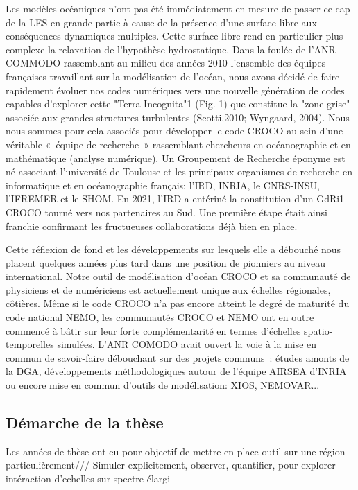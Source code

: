 Les modèles océaniques n’ont pas été immédiatement en mesure de passer ce cap de la LES en grande partie à cause de la présence d’une surface libre aux conséquences dynamiques multiples. Cette surface libre rend en particulier plus complexe la relaxation de l’hypothèse hydrostatique. Dans la foulée de l’ANR COMMODO rassemblant au milieu des années 2010 l’ensemble des équipes françaises travaillant sur la modélisation de l’océan, nous avons décidé de faire rapidement évoluer nos codes numériques vers une nouvelle génération de codes capables d'explorer cette "Terra Incognita"1 (Fig. 1) que constitue la "zone grise" associée aux grandes structures turbulentes (Scotti,2010; Wyngaard, 2004). Nous nous sommes pour cela associés pour développer le code CROCO au sein d’une véritable « équipe de recherche » rassemblant chercheurs en océanographie et en mathématique (analyse numérique). Un Groupement de Recherche éponyme est né associant l’université de Toulouse et les principaux organismes de recherche en informatique et en océanographie français: l’IRD, INRIA, le CNRS-INSU, l’IFREMER et le SHOM. En 2021, l’IRD a entériné la constitution d’un GdRi1 CROCO tourné vers nos partenaires au Sud. Une première étape était ainsi franchie confirmant les fructueuses collaborations déjà bien en place.

Cette réflexion de fond et les développements sur lesquels elle a débouché nous placent quelques années plus tard dans une position de pionniers au niveau international. Notre outil de modélisation d’océan CROCO et sa communauté de physiciens et de numériciens est actuellement unique aux échelles régionales, côtières. Même si le code CROCO n’a pas encore atteint le degré de maturité du code national NEMO, les communautés CROCO et NEMO ont en outre commencé à bâtir sur leur forte complémentarité en termes d’échelles spatio-temporelles simulées. L’ANR COMODO avait ouvert la voie à la mise en commun de savoir-faire débouchant sur des projets communs : études amonts de la DGA, développements méthodologiques autour de l’équipe AIRSEA d’INRIA ou encore mise en commun d’outils de modélisation: XIOS, NEMOVAR...

\subsection{Démarche de la thèse}
Les années de thèse ont eu pour objectif de mettre en place outil sur une région particulièrement/// Simuler explicitement, observer, quantifier, pour explorer intéraction d'echelles sur spectre élargi


